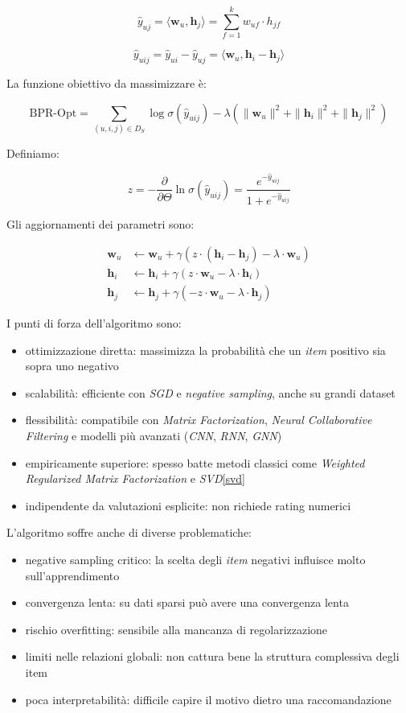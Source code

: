 \[
\hat{y}_{uj} = \langle \mathbf{w}_u, \mathbf{h}_j \rangle = \sum_{f=1}^{k} w_{uf} \cdot h_{jf}
\]

\[
\hat{y}_{uij} = \hat{y}_{ui} - \hat{y}_{uj} = \langle \mathbf{w}_u, \mathbf{h}_i - \mathbf{h}_j \rangle
\]


La funzione obiettivo da massimizzare è:

\[
\text{BPR-Opt} = \sum_{(u,i,j) \in D_S} \log \sigma(\hat{y}_{uij}) 
- \lambda \left( \|\mathbf{w}_u\|^2 + \|\mathbf{h}_i\|^2 + \|\mathbf{h}_j\|^2 \right)
\]

Definiamo:

\[
z = -\frac{\partial}{\partial \Theta} \ln \sigma(\hat{y}_{uij}) = \frac{e^{-\hat{y}_{uij}}}{1 + e^{-\hat{y}_{uij}}}
\]

Gli aggiornamenti dei parametri sono:

\begin{align*}
\mathbf{w}_u &\leftarrow \mathbf{w}_u + \gamma \left( z \cdot (\mathbf{h}_i - \mathbf{h}_j) - \lambda \cdot \mathbf{w}_u \right) \\
\mathbf{h}_i &\leftarrow \mathbf{h}_i + \gamma \left( z \cdot \mathbf{w}_u - \lambda \cdot \mathbf{h}_i \right) \\
\mathbf{h}_j &\leftarrow \mathbf{h}_j + \gamma \left( -z \cdot \mathbf{w}_u - \lambda \cdot \mathbf{h}_j \right)
\end{align*}

I punti di forza dell'algoritmo sono:

\begin{itemize}
    \item ottimizzazione diretta: massimizza la probabilità che un \textit{item} positivo sia sopra uno negativo
    \item scalabilità: efficiente con \textit{SGD} e \textit{negative sampling}, anche su grandi dataset
    \item flessibilità: compatibile con \textit{Matrix Factorization}, \textit{Neural Collaborative Filtering} e modelli più avanzati (\textit{CNN}, \textit{RNN}, \textit{GNN})
    \item empiricamente superiore: spesso batte metodi classici come \textit{Weighted Regularized Matrix Factorization} e \textit{SVD}\ref{svd}
    \item indipendente da valutazioni esplicite: non richiede rating numerici
\end{itemize}

L'algoritmo soffre anche di diverse problematiche:

\begin{itemize}
    \item negative sampling critico: la scelta degli \textit{item} negativi influisce molto sull'apprendimento
    \item convergenza lenta: su dati sparsi può avere una convergenza lenta
    \item rischio overfitting: sensibile alla mancanza di regolarizzazione
    \item limiti nelle relazioni globali: non cattura bene la struttura complessiva degli item
    \item poca interpretabilità: difficile capire il motivo dietro una raccomandazione
\end{itemize}

